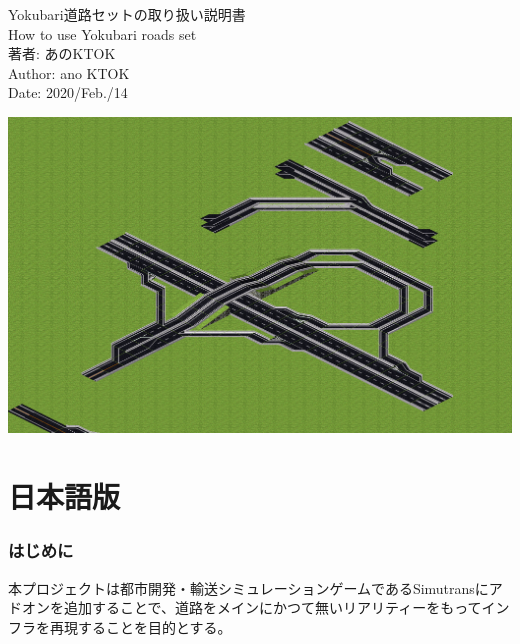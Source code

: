 \documentclass{jarticle}
\begin{document}
\begin{flushleft}

  { \fontsize{24pt}{0pt}\selectfont
    Yokubari道路セットの取り扱い説明書
  }
	\\
\vspace{3pt}
	{ \fontsize{12pt}{0pt}\selectfont
		How to use Yokubari roads set
	}
	\\
\vspace{15pt}
	{ \fontsize{18pt}{0pt}\selectfont
		著者: あのKTOK
	}
	\\
\vspace{2pt}
	{ \fontsize{12pt}{0pt}\selectfont
		Author: ano KTOK
	}
	\\
\vspace{15pt}
	{ \fontsize{12pt}{0pt}\selectfont
		Date: 2020/Feb./14
	}
\end{flushleft}

\vspace{15pt}
\begin{flushleft}
  \includegraphics[width = 15cm]{picture/20210207app1.png}
\end{flushleft}


\newpage

\renewcommand{\contentsname}{目次 / Index}
\tableofcontents

\newpage

\part{日本語版}

\section{はじめに}
本プロジェクトは都市開発・輸送シミュレーションゲームであるSimutransにアドオンを追加することで、道路をメインにかつて無いリアリティーをもってインフラを再現することを目的とする。
\end{document}
